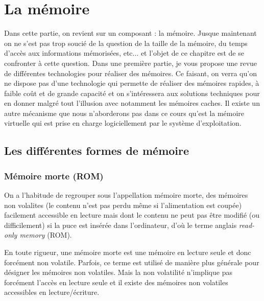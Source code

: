 \chapter{La mémoire}



Dans cette partie, on revient sur un composant : la mémoire. Jusque maintenant on ne s'est pas trop soucié de la question de la taille de la mémoire, du temps d'accès aux informations mémorisées, etc... et l'objet de ce chapitre est de se confronter à cette question. Dans une première partie, je vous propose une revue de différentes technologies pour réaliser des mémoires. Ce faisant, on verra qu'on ne dispose pas d'une technologie qui permette de réaliser des mémoires rapides, à faible coût et de grande capacité et on s'intéressera aux solutions techniques pour en donner malgré tout l'illusion avec notamment les mémoires caches. Il existe un autre mécanisme que nous n'aborderons pas dans ce cours qu'est la mémoire virtuelle qui est prise en charge logiciellement par le système d'exploitation.

\section{Les différentes formes de mémoire}

\subsection{Mémoire morte (ROM)}

On a l'habitude de regrouper sous l'appellation mémoire morte, des mémoires non volalites (le contenu n'est pas perdu même si l'alimentation est coupée) facilement accessible en lecture mais dont le contenu ne peut pas être modifié (ou difficilement) si la puce est insérée dans l'ordinateur, d'o{\`u} le terme anglais \emph{read-only memory} (ROM). 


En toute rigueur, une mémoire morte est une mémoire en lecture seule et donc forcément non volatile. Parfois, ce terme est utilisé de manière plus générale pour désigner les mémoires non volatiles. Mais la non volatilité n'implique pas forcément l'accès en lecture seule et il existe des mémoires non volatiles accessibles en lecture/écriture.

